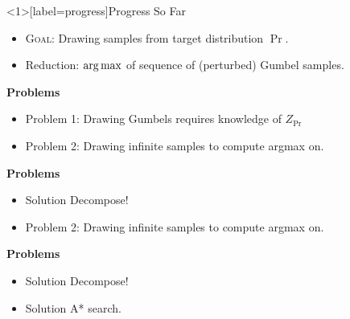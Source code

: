 \begin{frame}<1>[label=progress]{Progress So Far}
  
  \begin{itemize}
  \item \textsc{Goal}: Drawing samples from target distribution $\Pr$.
  \item Reduction: $\operatorname*{{arg\,max}}$ of sequence of (perturbed) Gumbel samples. %
  \end{itemize}
  \begin{overprint}

    \textbf{Problems}
    \begin{itemize}
    \item {\color{red}Problem 1:} Drawing Gumbels requires knowledge of $Z_{\Pr}$        %
    \item {\color{red}Problem 2:} Drawing infinite samples to compute argmax on. %
    \end{itemize}

    \textbf{Problems}
    \begin{itemize} 
    \item {\color{blue} Solution} Decompose! %
    \item {\color{red} Problem 2:} Drawing infinite samples to compute argmax on. %
    \end{itemize}

    \textbf{Problems}
    \begin{itemize} 
    \item {\color{blue} Solution} Decompose! %
    \item {\color{blue} Solution} A* search.
    \end{itemize}
  \end{overprint}
\end{frame}


